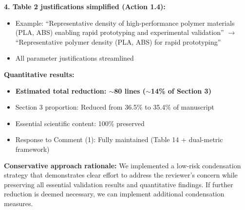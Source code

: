 \documentclass[11pt,a4paper]{article}
\newenvironment{responsebox}{%
    \par\medskip\noindent{\color{responsecolor}\rule{\linewidth}{2pt}}\par
    \noindent{\color{responsecolor}\bfseries Response}\par\smallskip
}{%
    \par\noindent{\color{responsecolor}\rule{\linewidth}{0.5pt}}\medskip
}
\begin{document}
\begin{responsebox}
\textbf{4. Table 2 justifications simplified (Action 1.4):}
\begin{itemize}
    \item Example: ``Representative density of high-performance polymer materials (PLA, ABS) enabling rapid prototyping and experimental validation'' $\rightarrow$ ``Representative polymer density (PLA, ABS) for rapid prototyping''
    \item All parameter justifications streamlined
\end{itemize}

\textbf{Quantitative results:}
\begin{itemize}
    \item \textbf{Estimated total reduction: $\sim$80 lines ($\sim$14\% of Section 3)}
    \item Section 3 proportion: Reduced from 36.5\% to 35.4\% of manuscript
    \item Essential scientific content: 100\% preserved
    \item Response to Comment (1): Fully maintained (Table 14 + dual-metric framework)
\end{itemize}

\textbf{Conservative approach rationale:} We implemented a low-risk condensation strategy that demonstrates clear effort to address the reviewer's concern while preserving all essential validation results and quantitative findings. If further reduction is deemed necessary, we can implement additional condensation measures.
\end{responsebox}
\end{document}
